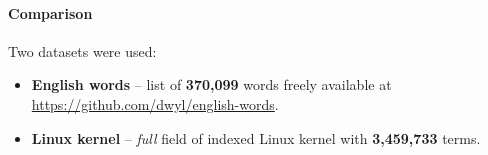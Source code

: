 
\paragraph{Comparison}

Two datasets were used:
\begin{itemize}
    \item \textbf{English words} – list of \textbf{370,099} words freely available at \url{https://github.com/dwyl/english-words}.
    \item \textbf{Linux kernel} – \textit{full} field of indexed Linux kernel with \textbf{3,459,733} terms.
\end{itemize}


